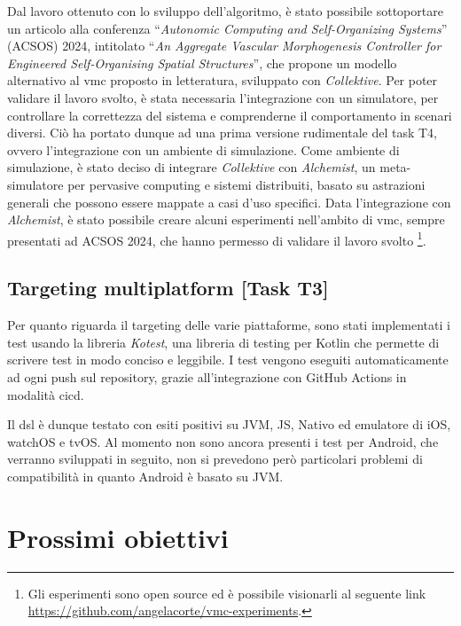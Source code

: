 \documentclass[13pt, a4paper]{article}
\newcommand{\ck}{\emph{Collektive}}
\begin{document}
Dal lavoro ottenuto con lo sviluppo dell'algoritmo,
    è stato possibile sottoportare un articolo alla conferenza ``\emph{Autonomic Computing and Self-Organizing Systems}'' (ACSOS) 2024,
    intitolato ``\emph{An Aggregate Vascular Morphogenesis Controller for Engineered Self-Organising Spatial Structures}'',
    che propone un modello alternativo al \ac{vmc} proposto in letteratura,
    sviluppato con \ck{}.
%
Per poter validare il lavoro svolto, è stata necessaria l'integrazione con un simulatore,
    per controllare la correttezza del sistema e comprenderne il comportamento in scenari diversi.
%
Ciò ha portato dunque ad una prima versione rudimentale del task T4, ovvero l'integrazione con un ambiente di simulazione.
%
Come ambiente di simulazione, è stato deciso di integrare \ck{} con \emph{Alchemist},
    un meta-simulatore per pervasive computing e sistemi distribuiti,
    basato su astrazioni generali che possono essere mappate a casi d'uso specifici.
%
Data l'integrazione con \emph{Alchemist}, è stato possibile creare alcuni esperimenti nell'ambito di \ac{vmc},
    sempre presentati ad ACSOS 2024, che hanno permesso di validare il lavoro svolto \footnote{
    Gli esperimenti sono open source ed è possibile visionarli al seguente link \url{https://github.com/angelacorte/vmc-experiments}.
}.

\subsection{Targeting multiplatform [Task T3]}\label{subsec:task-t3-[targeting-multiplatform]}
Per quanto riguarda il targeting delle varie piattaforme,
    sono stati implementati i test usando la libreria \emph{Kotest},
    una libreria di testing per Kotlin che permette di scrivere test in modo conciso e leggibile.
%
I test vengono eseguiti automaticamente ad ogni push sul repository, grazie all'integrazione con GitHub Actions in modalità \ac{cicd}.

Il \ac{dsl} è dunque testato con esiti positivi su JVM, JS, Nativo ed emulatore di iOS, watchOS e tvOS.
%
Al momento non sono ancora presenti i test per Android, che verranno sviluppati in seguito,
    non si prevedono però particolari problemi di compatibilità in quanto Android è basato su JVM.

\section{Prossimi obiettivi}\label{sec:prossimi-obiettivi}
\end{document}
